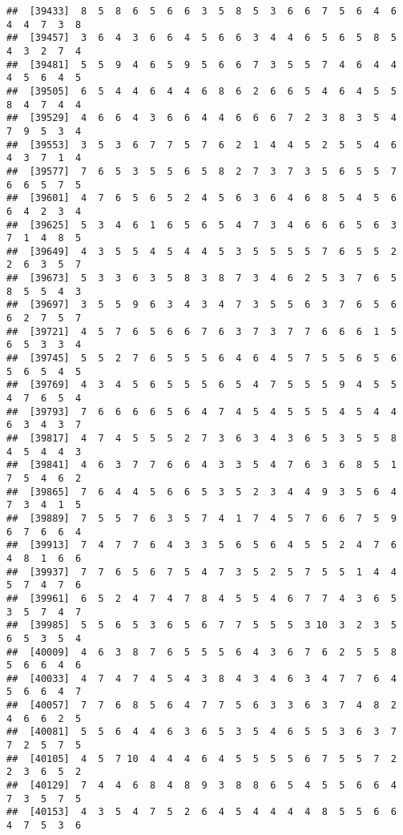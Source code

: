 \documentclass[
]{book}
\begin{document}
\begin{verbatim}
##  [39433]  8  5  8  6  5  6  6  3  5  8  5  3  6  6  7  5  6  4  6  4  4  7  3  8
##  [39457]  3  6  4  3  6  6  4  5  6  6  3  4  4  6  5  6  5  8  5  4  3  2  7  4
##  [39481]  5  5  9  4  6  5  9  5  6  6  7  3  5  5  7  4  6  4  4  4  5  6  4  5
##  [39505]  6  5  4  4  6  4  4  6  8  6  2  6  6  5  4  6  4  5  5  8  4  7  4  4
##  [39529]  4  6  6  4  3  6  6  4  4  6  6  6  7  2  3  8  3  5  4  7  9  5  3  4
##  [39553]  3  5  3  6  7  7  5  7  6  2  1  4  4  5  2  5  5  4  6  4  3  7  1  4
##  [39577]  7  6  5  3  5  5  6  5  8  2  7  3  7  3  5  6  5  5  7  6  6  5  7  5
##  [39601]  4  7  6  5  6  5  2  4  5  6  3  6  4  6  8  5  4  5  6  6  4  2  3  4
##  [39625]  5  3  4  6  1  6  5  6  5  4  7  3  4  6  6  6  5  6  3  7  1  4  8  5
##  [39649]  4  3  5  5  4  5  4  4  5  3  5  5  5  5  7  6  5  5  2  2  6  3  5  7
##  [39673]  5  3  3  6  3  5  8  3  8  7  3  4  6  2  5  3  7  6  5  8  5  5  4  3
##  [39697]  3  5  5  9  6  3  4  3  4  7  3  5  5  6  3  7  6  5  6  6  2  7  5  7
##  [39721]  4  5  7  6  5  6  6  7  6  3  7  3  7  7  6  6  6  1  5  6  5  3  3  4
##  [39745]  5  5  2  7  6  5  5  5  6  4  6  4  5  7  5  5  6  5  6  5  6  5  4  5
##  [39769]  4  3  4  5  6  5  5  5  6  5  4  7  5  5  5  9  4  5  5  4  7  6  5  4
##  [39793]  7  6  6  6  6  5  6  4  7  4  5  4  5  5  5  4  5  4  4  6  3  4  3  7
##  [39817]  4  7  4  5  5  5  2  7  3  6  3  4  3  6  5  3  5  5  8  4  5  4  4  3
##  [39841]  4  6  3  7  7  6  6  4  3  3  5  4  7  6  3  6  8  5  1  7  5  4  6  2
##  [39865]  7  6  4  4  5  6  6  5  3  5  2  3  4  4  9  3  5  6  4  7  3  4  1  5
##  [39889]  7  5  5  7  6  3  5  7  4  1  7  4  5  7  6  6  7  5  9  6  7  6  6  4
##  [39913]  7  4  7  7  6  4  3  3  5  6  5  6  4  5  5  2  4  7  6  4  8  1  6  6
##  [39937]  7  7  6  5  6  7  5  4  7  3  5  2  5  7  5  5  1  4  4  5  7  4  7  6
##  [39961]  6  5  2  4  7  4  7  8  4  5  5  4  6  7  7  4  3  6  5  3  5  7  4  7
##  [39985]  5  5  6  5  3  6  5  6  7  7  5  5  5  3 10  3  2  3  5  6  5  3  5  4
##  [40009]  4  6  3  8  7  6  5  5  5  6  4  3  6  7  6  2  5  5  8  5  6  6  4  6
##  [40033]  4  7  4  7  4  5  4  3  8  4  3  4  6  3  4  7  7  6  4  5  6  6  4  7
##  [40057]  7  7  6  8  5  6  4  7  7  5  6  3  3  6  3  7  4  8  2  4  6  6  2  5
##  [40081]  5  5  6  4  4  6  3  6  5  3  5  4  6  5  5  3  6  3  7  7  2  5  7  5
##  [40105]  4  5  7 10  4  4  4  6  4  5  5  5  5  6  7  5  5  7  2  2  3  6  5  2
##  [40129]  7  4  4  6  8  4  8  9  3  8  8  6  5  4  5  5  6  6  4  7  3  5  7  5
##  [40153]  4  3  5  4  7  5  2  6  4  5  4  4  4  4  8  5  5  6  6  4  7  5  3  6

\end{verbatim}
\end{document}
